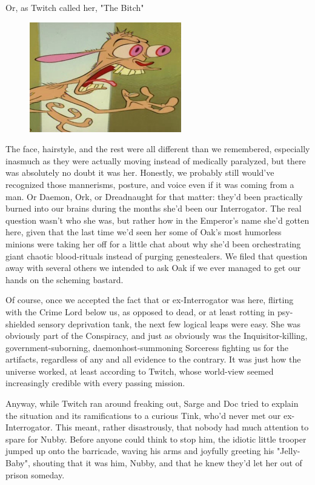 Or, as Twitch called her, "The Bitch"

\begin{figure}
	\begin{center}
		\includegraphics[width=\figwidth]{pics/18/52.png}
	\end{center}
\end{figure}
The face, hairstyle, and the rest were all different than we remembered, especially inasmuch as they were actually moving instead of medically paralyzed, but there was absolutely no doubt it was her. 
Honestly, we probably still would've recognized those mannerisms, posture, and voice even if it was coming from a man. 
Or Daemon, Ork, or Dreadnaught for that matter: 
they'd been practically burned into our brains during the months she'd been our Interrogator. 
The real question wasn't who she was, but rather how in the Emperor's name she'd gotten here, given that the last time we'd seen her some of Oak's most humorless minions were taking her off for a little chat about why she'd been orchestrating giant chaotic blood-rituals instead of purging genestealers. 
We filed that question away with several others we intended to ask Oak if we ever managed to get our hands on the scheming bastard.

Of course, once we accepted the fact that or ex-Interrogator was here, flirting with the Crime Lord below us, as opposed to dead, or at least rotting in psy-shielded sensory deprivation tank, the next few logical leaps were easy. 
She was obviously part of the Conspiracy, and just as obviously was the Inquisitor-killing, government-suborning, daemonhost-summoning Sorceress fighting us for the artifacts, regardless of any and all evidence to the contrary. 
It was just how the universe worked, at least according to Twitch, whose world-view seemed increasingly credible with every passing mission.

Anyway, while Twitch ran around freaking out, Sarge and Doc tried to explain the situation and its ramifications to a curious Tink, who'd never met our ex-Interrogator. 
This meant, rather disastrously, that nobody had much attention to spare for Nubby. 
Before anyone could think to stop him, the idiotic little trooper jumped up onto the barricade, waving his arms and joyfully greeting his "Jelly-Baby", shouting that it was him, Nubby, and that he knew they'd let her out of prison someday.

